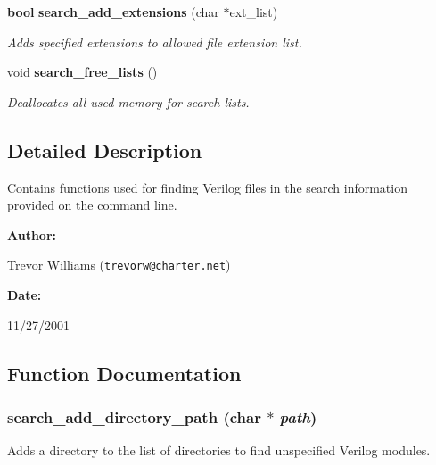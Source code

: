 \begin{CompactItemize}
{\bf bool} {\bf search\_\-add\_\-extensions} (char $\ast$ext\_\-list)
\begin{CompactList}\small\item\em Adds specified extensions to allowed file extension list.\item\end{CompactList}\item 
void {\bf search\_\-free\_\-lists} ()
\begin{CompactList}\small\item\em Deallocates all used memory for search lists.\item\end{CompactList}\end{CompactItemize}


\subsection{Detailed Description}
Contains functions used for finding Verilog files in the search information provided on the command line.



\begin{Desc}
\item[{\bf Author: }]\par
Trevor Williams ({\tt trevorw@charter.net}) \end{Desc}
\begin{Desc}
\item[{\bf Date: }]\par
11/27/2001

\end{Desc}


\subsection{Function Documentation}
\subsubsection{ search\_\-add\_\-directory\_\-path (char $\ast$ {\em path})}\label{search_8h_a2}


Adds a directory to the list of directories to find unspecified Verilog modules.

